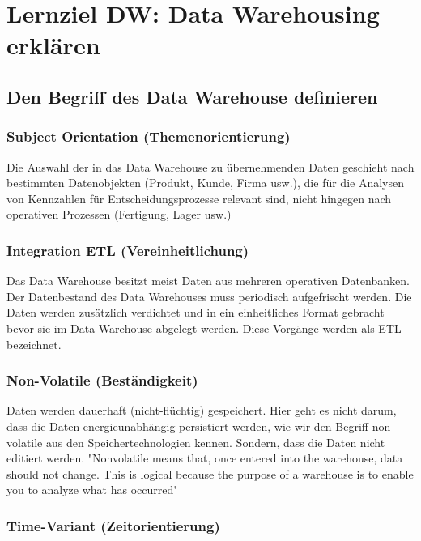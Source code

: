 \section{Lernziel DW: Data Warehousing erklären}

\subsection{Den Begriff des Data Warehouse definieren}

\subsubsection{Subject Orientation (Themenorientierung)}

Die Auswahl der in das Data Warehouse zu übernehmenden Daten geschieht nach bestimmten Datenobjekten (Produkt, Kunde, Firma usw.), die für die Analysen von Kennzahlen für Entscheidungsprozesse relevant sind, nicht hingegen nach operativen Prozessen (Fertigung, Lager usw.)

\subsubsection{Integration ETL (Vereinheitlichung)}

Das Data Warehouse besitzt meist Daten aus mehreren operativen Datenbanken. Der Datenbestand des Data Warehouses muss periodisch aufgefrischt werden. Die Daten werden zusätzlich verdichtet und in ein einheitliches Format gebracht bevor sie im Data Warehouse abgelegt werden. Diese Vorgänge werden als \ac{ETL} bezeichnet.

\subsubsection{Non-Volatile (Beständigkeit)}

Daten werden dauerhaft (nicht-flüchtig) gespeichert. Hier geht es nicht darum, dass die Daten energieunabhängig persistiert werden, wie wir den Begriff non-volatile aus den Speichertechnologien kennen. Sondern, dass die Daten nicht editiert werden. "Nonvolatile means that, once entered into the warehouse, data should not change. This is logical because the purpose of a warehouse is to enable you to analyze what has occurred"

\subsubsection{Time-Variant (Zeitorientierung)}

